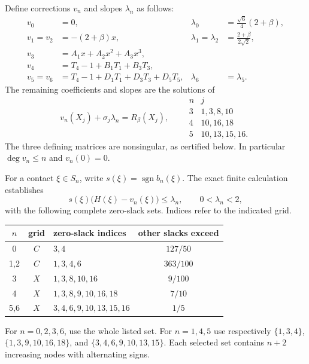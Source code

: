 \documentclass[11pt]{article}
\theoremstyle{remark}\newtheorem{remark}[theorem]{Remark}
\begin{document}
Define corrections $v_n$ and slopes $\lambda_n$ as follows:
\begin{align*}
 v_0&=0,&\lambda_0&=\tfrac{\sqrt6}{4}(2+\beta),\\
 v_1=v_2&=-(2+\beta)x,&\lambda_1=\lambda_2&=\tfrac{2+\beta}{2\sqrt2},\\
 v_3&=A_1x+A_2x^2+A_3x^3,\\
 v_4&=T_4-1+B_1T_1+B_3T_3,\\
 v_5=v_6&=T_4-1+D_1T_1+D_3T_3+D_5T_5,&\lambda_6&=\lambda_5.
\end{align*}
The remaining coefficients and slopes are the solutions of
\begin{equation}\label{origin:eq:systems}
 v_n(X_j)+\sigma_j\lambda_n=R_\beta(X_j),\qquad
 \begin{array}{c|l}
 n&j\\\hline
 3&1,3,8,10\\
 4&10,16,18\\
 5&10,13,15,16.
 \end{array}
\end{equation}
The three defining matrices are nonsingular, as certified below.
In particular $\deg v_n\le n$ and $v_n(0)=0$.

For a contact $\xi\in S_n$, write $s(\xi)=\operatorname{sgn} b_n(\xi)$.
The exact finite calculation establishes
\begin{equation}\label{origin:eq:finite}
 s(\xi)\bigl(H(\xi)-v_n(\xi)\bigr)\le\lambda_n,
 \qquad 0<\lambda_n<2,
\end{equation}
with the following complete zero-slack sets. Indices refer to the indicated grid.
\begin{center}
\begin{tabular}{cclc}
\toprule
$n$&grid&zero-slack indices&other slacks exceed\\\midrule
0&$C$&$3,4$&$127/50$\\
1,2&$C$&$1,3,4,6$&$363/100$\\
3&$X$&$1,3,8,10,16$&$9/100$\\
4&$X$&$1,3,8,9,10,16,18$&$7/10$\\
5,6&$X$&$3,4,6,9,10,13,15,16$&$1/5$\\\bottomrule
\end{tabular}
\end{center}
For $n=0,2,3,6$, use the whole listed set. For $n=1,4,5$ use respectively
$\{1,3,4\}$, $\{1,3,9,10,16,18\}$, and $\{3,4,6,9,10,13,15\}$.
Each selected set contains $n+2$ increasing nodes with alternating signs.
\end{document}
